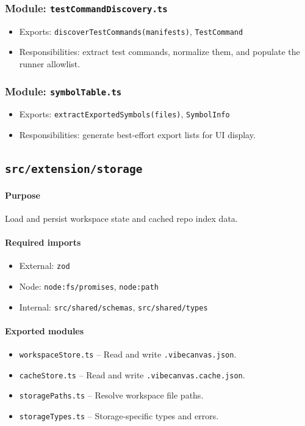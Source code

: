 \documentclass[11pt]{article}
\begin{document}
\subsubsection*{Module: \texttt{testCommandDiscovery.ts}}
\begin{itemize}[noitemsep]
  \item Exports: \texttt{discoverTestCommands(manifests)}, \texttt{TestCommand}
  \item Responsibilities: extract test commands, normalize them, and populate the runner allowlist.
\end{itemize}

\subsubsection*{Module: \texttt{symbolTable.ts}}
\begin{itemize}[noitemsep]
  \item Exports: \texttt{extractExportedSymbols(files)}, \texttt{SymbolInfo}
  \item Responsibilities: generate best-effort export lists for UI display.
\end{itemize}

\subsection{\texttt{src/extension/storage}}
\paragraph{Purpose} Load and persist workspace state and cached repo index data.

\paragraph{Required imports}
\begin{itemize}[noitemsep]
  \item External: \texttt{zod}
  \item Node: \texttt{node:fs/promises}, \texttt{node:path}
  \item Internal: \texttt{src/shared/schemas}, \texttt{src/shared/types}
\end{itemize}

\paragraph{Exported modules}
\begin{itemize}[noitemsep]
  \item \texttt{workspaceStore.ts} -- Read and write \texttt{.vibecanvas.json}.
  \item \texttt{cacheStore.ts} -- Read and write \texttt{.vibecanvas.cache.json}.
  \item \texttt{storagePaths.ts} -- Resolve workspace file paths.
  \item \texttt{storageTypes.ts} -- Storage-specific types and errors.
\end{itemize}
\end{document}
